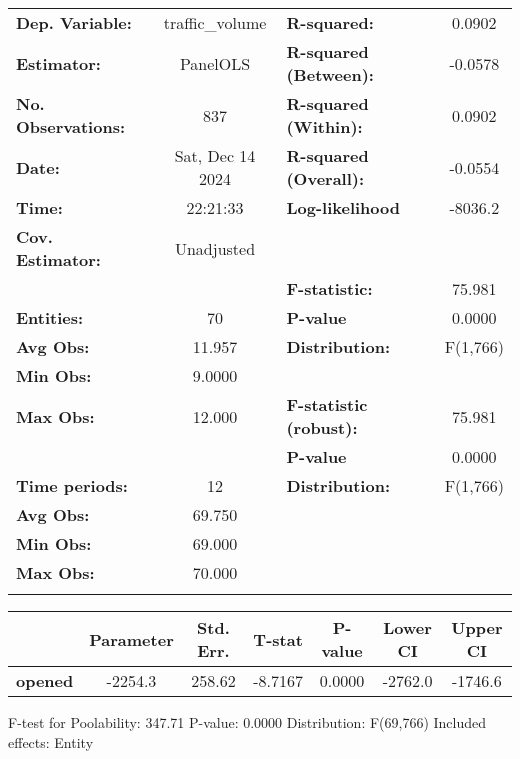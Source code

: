 \begin{center}
\begin{tabular}{lclc}
\toprule
\textbf{Dep. Variable:}    &  traffic\_volume   & \textbf{  R-squared:         }   &      0.0902      \\
\textbf{Estimator:}        &      PanelOLS      & \textbf{  R-squared (Between):}  &     -0.0578      \\
\textbf{No. Observations:} &        837         & \textbf{  R-squared (Within):}   &      0.0902      \\
\textbf{Date:}             &  Sat, Dec 14 2024  & \textbf{  R-squared (Overall):}  &     -0.0554      \\
\textbf{Time:}             &      22:21:33      & \textbf{  Log-likelihood     }   &     -8036.2      \\
\textbf{Cov. Estimator:}   &     Unadjusted     & \textbf{                     }   &                  \\
\textbf{}                  &                    & \textbf{  F-statistic:       }   &      75.981      \\
\textbf{Entities:}         &         70         & \textbf{  P-value            }   &      0.0000      \\
\textbf{Avg Obs:}          &       11.957       & \textbf{  Distribution:      }   &     F(1,766)     \\
\textbf{Min Obs:}          &       9.0000       & \textbf{                     }   &                  \\
\textbf{Max Obs:}          &       12.000       & \textbf{  F-statistic (robust):} &      75.981      \\
\textbf{}                  &                    & \textbf{  P-value            }   &      0.0000      \\
\textbf{Time periods:}     &         12         & \textbf{  Distribution:      }   &     F(1,766)     \\
\textbf{Avg Obs:}          &       69.750       & \textbf{                     }   &                  \\
\textbf{Min Obs:}          &       69.000       & \textbf{                     }   &                  \\
\textbf{Max Obs:}          &       70.000       & \textbf{                     }   &                  \\
\textbf{}                  &                    & \textbf{                     }   &                  \\
\bottomrule
\end{tabular}
\begin{tabular}{lcccccc}
                & \textbf{Parameter} & \textbf{Std. Err.} & \textbf{T-stat} & \textbf{P-value} & \textbf{Lower CI} & \textbf{Upper CI}  \\
\midrule
\textbf{opened} &      -2254.3       &       258.62       &     -8.7167     &      0.0000      &      -2762.0      &      -1746.6       \\
\bottomrule
\end{tabular}
\end{center}

F-test for Poolability: 347.71 \newline
 P-value: 0.0000 \newline
 Distribution: F(69,766) \newline
  \newline
 Included effects: Entity